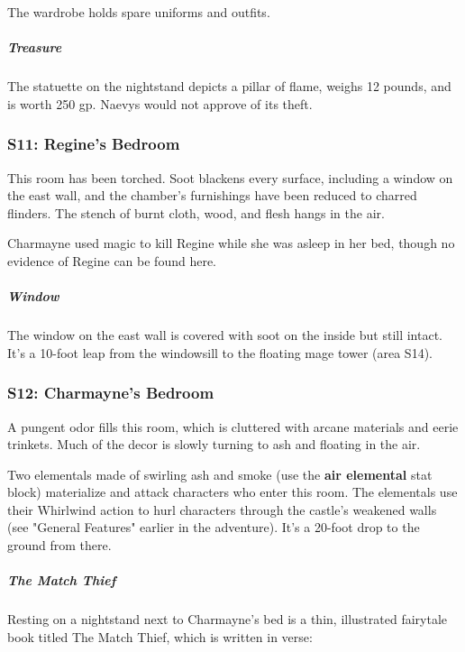\documentclass[10pt,a4paper,twoside,bg=print,twocolumn,openany,nodeprecatedcode]{dndbook}
\begin{document}
The wardrobe holds spare uniforms and outfits.

\subparagraph{Treasure}
The statuette on the nightstand depicts a pillar of flame, weighs 12 pounds, and is worth 250 gp. Naevys would not approve of its theft.

\subsubsection{S11: Regine's Bedroom}
\begin{DndReadAloud}{}
This room has been torched. Soot blackens every surface, including a window on the east wall, and the chamber's furnishings have been reduced to charred flinders. The stench of burnt cloth, wood, and flesh hangs in the air.

\end{DndReadAloud}

Charmayne used magic to kill Regine while she was asleep in her bed, though no evidence of Regine can be found here.

\subparagraph{Window}
The window on the east wall is covered with soot on the inside but still intact. It's a 10-foot leap from the windowsill to the floating mage tower (area S14).

\subsubsection{S12: Charmayne's Bedroom}
\begin{DndReadAloud}{}
A pungent odor fills this room, which is cluttered with arcane materials and eerie trinkets. Much of the decor is slowly turning to ash and floating in the air.

\end{DndReadAloud}

Two elementals made of swirling ash and smoke (use the \textbf{air elemental} stat block) materialize and attack characters who enter this room. The elementals use their Whirlwind action to hurl characters through the castle's weakened walls (see "General Features" earlier in the adventure). It's a 20-foot drop to the ground from there.

\subparagraph{The Match Thief}
Resting on a nightstand next to Charmayne's bed is a thin, illustrated fairytale book titled The Match Thief, which is written in verse:
\end{document}
